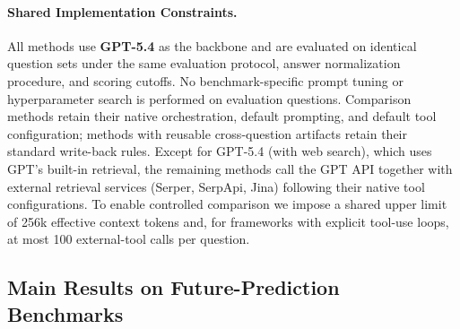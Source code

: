 \paragraph{Shared Implementation Constraints.}
All methods use \textbf{GPT-5.4} as the backbone and are evaluated on identical question sets under the same evaluation protocol, answer normalization procedure, and scoring cutoffs. No benchmark-specific prompt tuning or hyperparameter search is performed on evaluation questions. Comparison methods retain their native orchestration, default prompting, and default tool configuration; methods with reusable cross-question artifacts retain their standard write-back rules. Except for GPT-5.4 (with web search), which uses GPT's built-in retrieval, the remaining methods call the GPT API together with external retrieval services (Serper, SerpApi, Jina) following their native tool configurations. To enable controlled comparison we impose a shared upper limit of 256k effective context tokens and, for frameworks with explicit tool-use loops, at most 100 external-tool calls per question.

\subsection{Main Results on Future-Prediction Benchmarks}
\label{sec:prediction_results}

